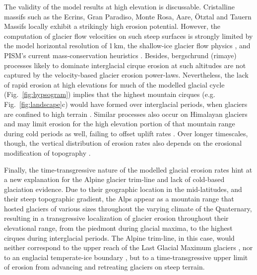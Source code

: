 \documentclass[esurf, manuscript]{copernicus}
\begin{document}
    The validity of the model results at high elevation is discussable.
    Cristalline massifs such as the Ecrins, Gran Paradiso, Monte Rosa, Aare,
    \"Otztal and Tauern Massifs locally exhibit a strikingly high erosion
    potential. However, the computation of glacier flow velocities on such
    steep surfaces is strongly limited by the model horizontal resolution of
    1\,km, the shallow-ice glacier flow physics \citep{Imhof.etal.2019}, and
    PISM's current mass-conservation heuristics \citep{Imhof.2021}. Besides,
    bergschrund (rimaye) processes likely to dominate interglacial cirque
    erosion at such altitudes \citep{Sanders.etal.2012} are not captured by the
    velocity-based glacier erosion power-laws. Nevertheless,
    the lack of rapid erosion at high elevations for much of the modelled
    glacial cycle (Fig.~\ref{fig:hypsogram}) implies that the highest mountain
    cirques (e.g. Fig.~\ref{fig:landscape}c) would have formed
    over interglacial periods, when glaciers are confined to high terrain
    \citep{Barr.etal.2017, Barr.etal.2019}. Similar processes also occur on
    Himalayan glaciers and may limit erosion for the high elevation portion of
    that mountain range during cold periods as well, failing to offset uplift
    rates \citep{Harper.Humphrey.2003}. Over longer timescales, though, the
    vertical distribution of erosion rates also depends on the erosional
    modification of topography \citep{Sternai.etal.2013}.

    Finally, the time-transgressive nature of the modelled glacial erosion
    rates hint at a new explanation for the Alpine glacier trim-line and lack
    of cold-based glaciation evidence. Due to their geographic location in the
    mid-latitudes, and their steep topographic gradient, the Alps appear as a
    mountain range that hosted glaciers of various sizes throughout the varying
    climate of the Quaternary, resulting in a transgressive localization of
    glacier erosion throughout their elevational range, from the piedmont
    during glacial maxima, to the highest cirques during interglacial periods.
    The Alpine trim-line, in this case, would neither correspond to the upper
    reach of the Last Glacial Maximum glaciers \citep[e.g.,][]{Kelly.etal.2004},
    nor to an englacial temperate-ice boundary \citep{Coutterand.2010,
    Seguinot.etal.2018}, but to a time-transgressive upper limit of erosion from
    advancing and retreating glaciers on steep terrain.


\conclusions
\end{document}
